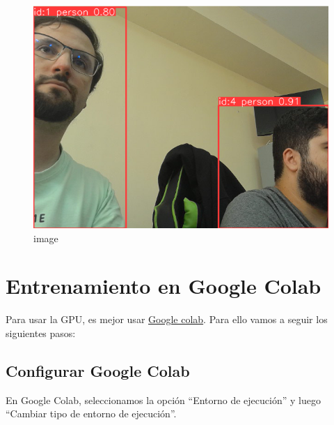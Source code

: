 \documentclass[11pt]{article}
\begin{document}
    \begin{figure}
\centering
\includegraphics{imgs/camara con tracker.png}
\caption{image}
\end{figure}

    \section{Entrenamiento en Google
Colab}\label{entrenamiento-en-google-colab}

    Para usar la GPU, es mejor usar
\href{https://colab.research.google.com/drive/1kdhELxiiiV_b1F85cdr8fet8iHr_7gVU?usp=sharing}{Google
colab}. Para ello vamos a seguir los siguientes pasos:

    \subsection{Configurar Google
Colab}\label{configurar-google-colab}

    En Google Colab, seleccionamos la opción ``Entorno de ejecución'' y
luego ``Cambiar tipo de entorno de ejecución''.
\end{document}
